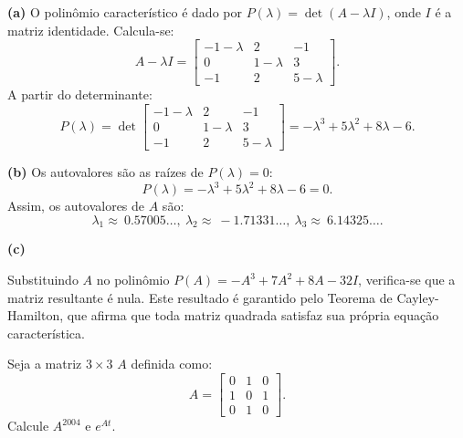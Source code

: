 \begin{resolution}
  {\bf (a)} O polinômio característico é dado por \( P(\lambda) = \det(A - \lambda I) \), onde \( I \) é a matriz identidade. Calcula-se:
  \[
    A - \lambda I = \begin{bmatrix}
      -1 - \lambda & 2           & -1          \\
      0            & 1 - \lambda & 3           \\
      -1           & 2           & 5 - \lambda
    \end{bmatrix}.
  \]
  A partir do determinante:
  \[
    P(\lambda) = \det\begin{bmatrix}
      -1 - \lambda & 2           & -1          \\
      0            & 1 - \lambda & 3           \\
      -1           & 2           & 5 - \lambda
    \end{bmatrix} = -\lambda^3+5\lambda^2+8\lambda-6.
  \]

  {\bf (b)}  Os autovalores são as raízes de \( P(\lambda) = 0 \):
  \[
    P(\lambda) = -\lambda^3+5\lambda^2+8\lambda-6 = 0.
  \]
  Assim, os autovalores de \( A \) são:
  \[
    \lambda_1 \approx \:0.57005\dots ,\:\lambda_2 \approx \:-1.71331\dots ,\:\lambda_3 \approx \:6.14325\dots .
  \]

  {\bf (c)}

  Substituindo \( A \) no polinômio \( P(A) = -A^3 + 7A^2 + 8A - 32I \), verifica-se que a matriz resultante é nula. Este resultado é garantido pelo Teorema de Cayley-Hamilton, que afirma que toda matriz quadrada satisfaz sua própria equação característica.
\end{resolution}

\begin{question}
  Seja a matriz $3 \times 3$ $A$ definida como:
  \[
    A =
    \begin{bmatrix}
      0 & 1 & 0 \\
      1 & 0 & 1 \\
      0 & 1 & 0
    \end{bmatrix}.
  \]
  Calcule $A^{2004}$ e $e^{At}$.
\end{question}

